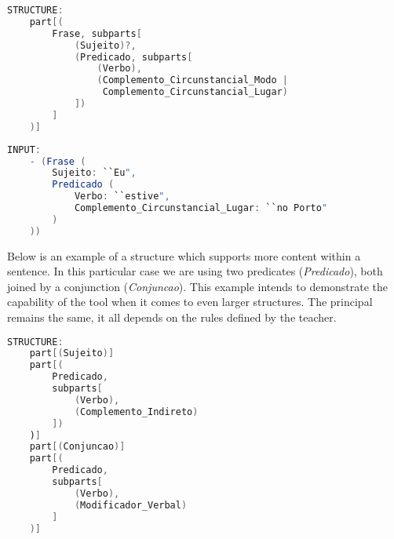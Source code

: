 \begin{center}
\begin{minipage}{14cm}
\begin{lstlisting}[language=java, basicstyle=\small, label={lst:example_structure4}, caption=Example of a sentence structure]
STRUCTURE:
    part[(
        Frase, subparts[
            (Sujeito)?,
            (Predicado, subparts[
                (Verbo),
                (Complemento_Circunstancial_Modo | 
                 Complemento_Circunstancial_Lugar)
            ])
        ]
    )]
\end{lstlisting}
\end{minipage}
\end{center}

\begin{center}
\begin{minipage}{14cm}
\begin{lstlisting}[language=java, basicstyle=\small, label={lst:example_input4}, caption=Example of a sentence input]
INPUT:
    - (Frase (
        Sujeito: ``Eu",
        Predicado (
            Verbo: ``estive",
            Complemento_Circunstancial_Lugar: ``no Porto"
        )
    ))
\end{lstlisting}
\end{minipage}
\end{center}


Below is an example of a structure which supports more content within a sentence.
In this particular case we are using two predicates (\textit{Predicado}), both joined by a conjunction (\textit{Conjuncao}).
This example intends to demonstrate the capability of the tool when it comes to even larger structures.
The principal remains the same, it all depends on the rules defined by the teacher.

\begin{center}
\begin{minipage}{10cm}
\begin{lstlisting}[language=java, basicstyle=\tiny, label={lst:example_complex_structure}, caption=Example of a more complex structure]
STRUCTURE:
    part[(Sujeito)]
    part[(
        Predicado,
        subparts[
            (Verbo),
            (Complemento_Indireto)
        ])
    )]
    part[(Conjuncao)]
	part[(
        Predicado,
        subparts[
            (Verbo),
            (Modificador_Verbal)
        ]
    )]
\end{lstlisting}
\end{minipage}
\end{center}


